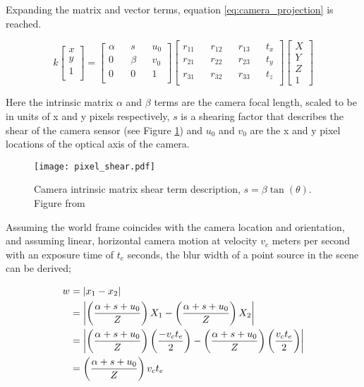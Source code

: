 Expanding the matrix and vector terms, equation \ref{eq:camera_projection} is reached.

\begin{equation}
\label{eq:camera_projection}
k
\begin{bmatrix}
x \\
y \\
1 \\
\end{bmatrix}
=
\begin{bmatrix}
\alpha && s && u_0 \\
0 && \beta && v_0 \\
0 && 0 && 1 \\
\end{bmatrix}
\begin{bmatrix}
r_{11} && r_{12} && r_{13} && t_x \\
r_{21} && r_{22} && r_{23} && t_y \\
r_{31} && r_{32} && r_{33} && t_z \\
\end{bmatrix}
\begin{bmatrix}
X \\
Y \\
Z \\
1
\end{bmatrix}
\end{equation}

Here the intrinsic matrix $\alpha$ and $\beta$ terms are the camera focal length, scaled to be in units of x and y pixels respectively, $s$ is a shearing factor that describes the shear of the camera sensor (see Figure \ref{fig:intrinsic_shear}) and $u_0$ and $v_0$ are the x and y pixel locations of the optical axis of the camera.

\begin{figure}[h]
\centering
\texttt{[image: pixel\_shear.pdf]}
\caption[Camera intrinsic matrix shear term]{Camera intrinsic matrix shear term description, $s = \beta\tan(\theta)$. Figure from \cite{pollefeys2002visual}}
\label{fig:intrinsic_shear}
\end{figure}

Assuming the world frame coincides with the camera location and orientation, and assuming linear, horizontal camera motion at velocity $v_c$ meters per second with an exposure time of $t_e$ seconds, the blur width of a point source in the scene can be derived;

\begin{align}
w &= \left| x_1 - x_2 \right| \notag \\
&= \left| \left( \frac{\alpha + s + u_0}{Z} \right) X_1 - \left( \frac{\alpha + s + u_0}{Z} \right) X_2 \right| \notag \\
&= \left| \left( \frac{\alpha + s + u_0}{Z} \right) \left(\frac{- v_c t_e}{2}\right) - \left( \frac{\alpha + s + u_0}{Z} \right) \left(\frac{v_c t_e}{2}\right) \right| \notag \\
\label{eq:blur_width_full}
&= \left( \frac{\alpha + s + u_0}{Z} \right) v_c t_e
\end{align}

